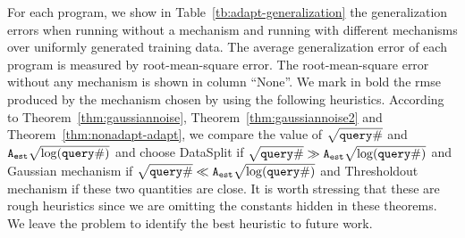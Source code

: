 For each program, we show in Table~\ref{tb:adapt-generalization} the
generalization errors when running without a mechanism and running
with different mechanisms over uniformly generated training data.  The
average generalization error of each program is measured by
root-mean-square error.  The root-mean-square error without any
mechanism is shown in column ``None''. 
We mark in bold the rmse
produced by the mechanism chosen by {\THESYSTEM} using the following
heuristics.  According to Theorem~\ref{thm:gaussiannoise},
Theorem~\ref{thm:gaussiannoise2} and Theorem~\ref{thm:nonadapt-adapt},
we compare the value of $\sqrt{{\tt query} \#}$ and
${\mathtt{A_{est}}}\sqrt{\log({\tt query} \#)}$ and choose DataSplit if
$\sqrt{{\tt query} \#} \gg {\ensuremath{\mathtt{A_{est}}}}\sqrt{\log({\tt query} \#)}$ and Gaussian
mechanism if $\sqrt{{\tt query} \#} \ll {\ensuremath{\mathtt{A_{est}}}}\sqrt{\log({\tt query} \#)}$ and
Thresholdout mechanism if these two quantities are close. 
 It is worth
stressing that these are rough heuristics since we are omitting the
constants hidden in these theorems. We leave the problem to identify
the best heuristic to future work.




